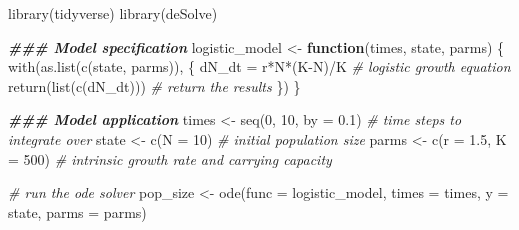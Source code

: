 \documentclass[
]{book}
\newenvironment{Shaded}{\begin{snugshade}}{\end{snugshade}}
\newcommand{\AttributeTok}[1]{\textcolor[rgb]{0.77,0.63,0.00}{#1}}
\newcommand{\CommentTok}[1]{\textcolor[rgb]{0.56,0.35,0.01}{\textit{#1}}}
\newcommand{\ControlFlowTok}[1]{\textcolor[rgb]{0.13,0.29,0.53}{\textbf{#1}}}
\newcommand{\DecValTok}[1]{\textcolor[rgb]{0.00,0.00,0.81}{#1}}
\newcommand{\DocumentationTok}[1]{\textcolor[rgb]{0.56,0.35,0.01}{\textbf{\textit{#1}}}}
\newcommand{\FloatTok}[1]{\textcolor[rgb]{0.00,0.00,0.81}{#1}}
\newcommand{\FunctionTok}[1]{\textcolor[rgb]{0.00,0.00,0.00}{#1}}
\newcommand{\NormalTok}[1]{#1}
\newcommand{\OtherTok}[1]{\textcolor[rgb]{0.56,0.35,0.01}{#1}}
\newcommand{\SpecialCharTok}[1]{\textcolor[rgb]{0.00,0.00,0.00}{#1}}
\begin{document}
\begin{Shaded}
\begin{Highlighting}[]
\FunctionTok{library}\NormalTok{(tidyverse)}
\FunctionTok{library}\NormalTok{(deSolve)}

\DocumentationTok{\#\#\# Model specification}
\NormalTok{logistic\_model }\OtherTok{\textless{}{-}} \ControlFlowTok{function}\NormalTok{(times, state, parms) \{}
  \FunctionTok{with}\NormalTok{(}\FunctionTok{as.list}\NormalTok{(}\FunctionTok{c}\NormalTok{(state, parms)), \{}
\NormalTok{    dN\_dt }\OtherTok{=}\NormalTok{ r}\SpecialCharTok{*}\NormalTok{N}\SpecialCharTok{*}\NormalTok{(K}\SpecialCharTok{{-}}\NormalTok{N)}\SpecialCharTok{/}\NormalTok{K  }\CommentTok{\# logistic growth equation}
    \FunctionTok{return}\NormalTok{(}\FunctionTok{list}\NormalTok{(}\FunctionTok{c}\NormalTok{(dN\_dt)))  }\CommentTok{\# return the results  }
\NormalTok{  \})}
\NormalTok{\}}

\DocumentationTok{\#\#\# Model application}
\NormalTok{times }\OtherTok{\textless{}{-}} \FunctionTok{seq}\NormalTok{(}\DecValTok{0}\NormalTok{, }\DecValTok{10}\NormalTok{, }\AttributeTok{by =} \FloatTok{0.1}\NormalTok{)  }\CommentTok{\# time steps to integrate over}
\NormalTok{state }\OtherTok{\textless{}{-}} \FunctionTok{c}\NormalTok{(}\AttributeTok{N =} \DecValTok{10}\NormalTok{)  }\CommentTok{\# initial population size}
\NormalTok{parms }\OtherTok{\textless{}{-}} \FunctionTok{c}\NormalTok{(}\AttributeTok{r =} \FloatTok{1.5}\NormalTok{, }\AttributeTok{K =} \DecValTok{500}\NormalTok{)  }\CommentTok{\# intrinsic growth rate and carrying capacity}

\CommentTok{\# run the ode solver}
\NormalTok{pop\_size }\OtherTok{\textless{}{-}} \FunctionTok{ode}\NormalTok{(}\AttributeTok{func =}\NormalTok{ logistic\_model, }\AttributeTok{times =}\NormalTok{ times, }\AttributeTok{y =}\NormalTok{ state, }\AttributeTok{parms =}\NormalTok{ parms)}


\end{Highlighting}
\end{Shaded}
\end{document}
